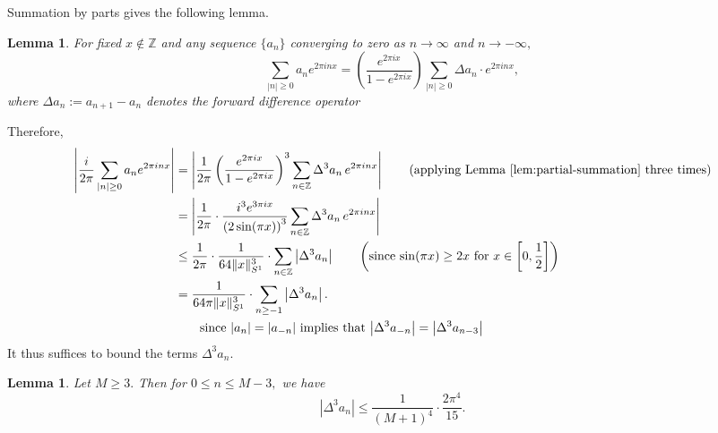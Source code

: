 \documentclass[11pt,letterpaper,reqno]{amsart}
\newtheorem{lemma}[theorem]{Lemma}
\theoremstyle{definition}
\numberwithin{equation}{section}
\numberwithin{figure}{section}
\numberwithin{table}{section}
\begin{document}
Summation by parts gives the following lemma.

\begin{lemma}\label{lem:partial-summation}
    For fixed $x \notin \mathbb{Z}$ and any sequence $\{a_n\}$ converging to zero as $n \rightarrow \infty$ and $n \rightarrow -\infty,$
    $$\sum_{|n| \geq 0} a_n e^{2\pi i n x} = \left( \frac{e^{2\pi i x}}{1 - e^{2\pi i x}} \right) \sum_{|n| \geq 0} \Delta a_n \cdot e^{2\pi i n x},$$
    where $\Delta a_n := a_{n + 1} - a_n$ denotes the forward difference operator
\end{lemma}

Therefore,
\begin{align}
     \left| \frac{i}{2\pi} \sum_{|n|\ge 0} a_n e^{2\pi i n x}\right| 
     &= \left|\frac{1}{2\pi}  \left(  \frac{e^{2\pi i x}}{1 - e^{2\pi i x}} \right)^3\sum_{n \in \mathbb{Z}} \Delta^{3} a_n\, e^{2\pi i n x}\right| \qquad \text{(applying Lemma \ref{lem:partial-summation} three times)}\\
     &= \left| \frac{1}{2\pi} \cdot  \frac{i^3 e^{3\pi i x}}{\left( 2 \sin(\pi x)\right)^3} \sum_{n \in \mathbb{Z}} \Delta^{3} a_n\, e^{2\pi i n x}\right|\\
    &\leq\frac{1}{2\pi}  \cdot   \frac{1}{64\|x\|_{S^1}^3} \cdot \sum_{n \in \mathbb{Z}} \left| \Delta^{3} a_n \right| \qquad \left( \text{since $\sin(\pi x) \geq 2x$ for $x \in \left[0, \frac{1}{2} \right]$} \right)\\ 
    &= \frac{1}{64 \pi \|x\|_{S^1}^3} \cdot \sum_{n \geq -1} \left| \Delta^{3} a_n \right|. \label{eqn:sum-after-triple-abel-summation}\\
    & \qquad \text{since $\left| a_n \right| = \left|a_{-n} \right|$ implies that $\left| \Delta^3 a_{-n} \right| = \left| \Delta^3 a_{n - 3} \right|$}
\end{align}
It thus suffices to bound the terms $\Delta^3 a_{n}.$
\begin{lemma}
    Let $M \geq 3.$ Then for $0 \leq n \leq M-3,$ we have
    $$\left| \Delta^3 a_n \right| \leq \frac{1}{(M+1)^4} \cdot \frac{2\pi^4}{15}.$$
\end{lemma}
\end{document}
